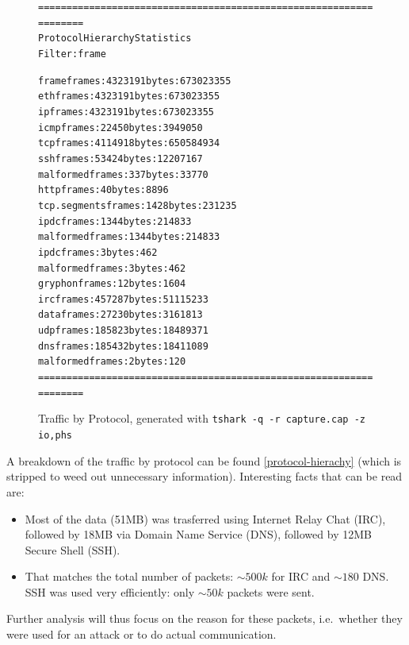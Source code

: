 \documentclass[a4paper,
    11pt,
    normalheadings,
    parindent,
    UKenglish,
    abstracton,
    ]{scrartcl}
\newcommand{\FIXME}[1]{\mbox{}\marginpar{\footnotesize\raggedright\hspace{0pt}\color{red}\emph{#1}}}
\begin{document}
\begin{figure}
\begin{alltt}
===================================================================
Protocol Hierarchy Statistics
Filter: frame

frame                                    frames:4323191 bytes:673023355
  eth                                    frames:4323191 bytes:673023355
    ip                                   frames:4323191 bytes:673023355
      icmp                               frames:22450 bytes:3949050
      tcp                                frames:4114918 bytes:650584934
        ssh                              frames:53424 bytes:12207167
          malformed                      frames:337 bytes:33770
        http                             frames:40 bytes:8896
        tcp.segments                     frames:1428 bytes:231235
          ipdc                           frames:1344 bytes:214833
            malformed                    frames:1344 bytes:214833
              ipdc                       frames:3 bytes:462
                malformed                frames:3 bytes:462
          gryphon                        frames:12 bytes:1604
        irc                              frames:457287 bytes:51115233
        data                             frames:27230 bytes:3161813
      udp                                frames:185823 bytes:18489371
        dns                              frames:185432 bytes:18411089
          malformed                      frames:2 bytes:120
===================================================================
\end{alltt}
  \caption{Traffic by Protocol, generated with \texttt{tshark -q -r capture.cap -z io,phs}}
  \label{protocol-hierachy}
\end{figure}
A breakdown of the traffic by protocol can be found \autoref{protocol-hierachy} (which is stripped to weed out unnecessary information). \FIXME{capitalisation} %
Interesting facts that can be read are:
\begin{itemize}
    \item Most of the data (51MB) was trasferred using Internet Relay Chat (IRC), followed by 18MB via Domain Name Service (DNS), followed by 12MB Secure Shell (SSH).
    \item That matches the total number of packets: $\sim{}500k$ for IRC and $\sim{}180$ DNS. SSH was used very efficiently: only $\sim{}50k$ packets were sent.
\end{itemize}
Further analysis will thus focus on the reason for these  packets, i.e.\, whether they were used for an attack or to do actual communication.
\end{document}
